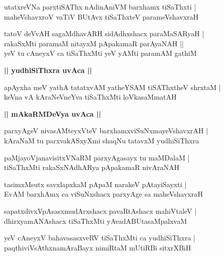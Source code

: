 \documentclass[twoside,12pt,openright]{book}
\newcounter{shloka}[chapter]
\def\uvaca#1{\centerline{{\large\textbf{#1}}}}
\begin{document}
\begin{shloka}
utatxreVNa parxtiSAThx nAdinAniVM barxhamx tiSaThxti |\\
maheVshavxroV vaTiV BUtAvx tiSaThxteV parameVshavxraH 
\end{shloka}

\begin{shloka}
tatoV deVvAH sagaMdhavARH sidAdhxshacx paraMaSARyaH |\\
rakaSxMti paramaM nitayxM pApakamaR parAyaNAH ||\\
yeV tu cAneyxV ca tiSaThxMti yeV yAMti paramAM gathiM 
\end{shloka}

\uvaca{|| yudhiSiThxra uvAca ||}

\begin{shloka}
apAyxha meV yathA tatatxvAM yatheYSAM tiSAThxtheV shrxtaM |\\
keVna vA kAraNeVneYva tiSaThxMti loVkasaMmatAH 
\end{shloka}

\uvaca{|| mAkaRMDeVya uvAca ||}

\begin{shloka}
parxyAgeV nivasAMteyxVteV barxhamxviSuNxmayeVshavxrAH |\\
kAraNaM tu parxvakASxyXmi shaqNu tatavxM yudhiSiThxra 
\end{shloka}

\begin{shloka}
paMjayoVjanavisitxVNaRM parxyAgasayx tu maMDalaM |\\
tiSaThxMti rakaSxNAdhARya pApakamaR nivAraNAH 
\end{shloka}

\begin{shloka}
tasimxMsutx savxlapxkaM pApaM narakeV pAtayiSayxti |\\
EvAM barxhAmx ca viSuNxshacx parxyAge sa maheVshavxraH
\end{shloka}

\begin{shloka}
sapatxdivxVpAsasxmudArxshacx pavaRtAshacx mahiVtaleV |\\
dhirxyamANAshacx tiSaThxMti yAvadABUtasaMpalxvaM 
\end{shloka}

\begin{shloka}
yeV cAneyxV bahavasasxveRV tiSaThxMti ca yudhiSiThxra |\\
paqthiviVsAthxnamAraBayx nimiRtaM mUtiRBi sitxrXBiH
\end{shloka}
\end{document}
